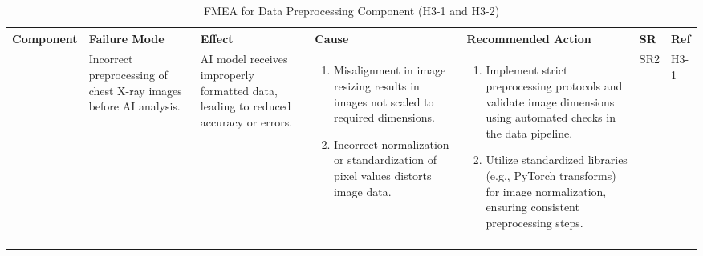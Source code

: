 \documentclass{article}
\begin{document}
\begin{landscape}
    \begin{table}[ht]
    \centering
    \caption{FMEA for Data Preprocessing Component (H3-1 and H3-2)}
    \renewcommand{\arraystretch}{1.1}
    {
    \setlength{\tabcolsep}{2pt}
    \begin{tabular}{|p{2.5cm}|p{2.5cm}|p{3cm}|p{5cm}|p{6cm}|p{1cm}|p{1cm}|}
    \hline
    \textbf{Component} & \textbf{Failure Mode} & \textbf{Effect} & \textbf{Cause} & \textbf{Recommended Action} & \textbf{SR} & \textbf{Ref} \\
    \hline

    \multirow{2}{*}{} 
     & Incorrect preprocessing of chest X-ray images before AI analysis.
     & AI model receives improperly formatted data, leading to reduced accuracy or errors.
     &
     \begin{enumerate}[leftmargin=*, label={\alph*.}, itemsep=1pt]
         \item Misalignment in image resizing results in images not scaled to required dimensions.
         \item Incorrect normalization or standardization of pixel values distorts image data.
     \end{enumerate}
     &
     \begin{enumerate}[leftmargin=*, label={\alph*.}, itemsep=1pt]
         \item Implement strict preprocessing protocols and validate image dimensions using automated checks in the data pipeline.
         \item Utilize standardized libraries (e.g., PyTorch transforms) for image normalization, ensuring consistent preprocessing steps.
     \end{enumerate}
     & SR2 & H3-1 \\ \cline{2-7}


\end{tabular}}
\end{table}
\end{landscape}
\end{document}
